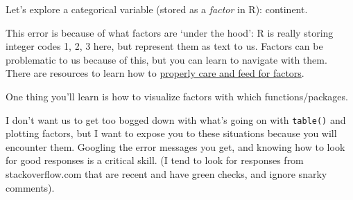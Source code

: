 \documentclass[]{book}
\newenvironment{Shaded}{\begin{snugshade}}{\end{snugshade}}
\newcommand{\KeywordTok}[1]{\textcolor[rgb]{0.13,0.29,0.53}{\textbf{{#1}}}}
\newcommand{\CommentTok}[1]{\textcolor[rgb]{0.56,0.35,0.01}{\textit{{#1}}}}
\newcommand{\NormalTok}[1]{{#1}}
\theoremstyle{definition}
\theoremstyle{definition}
\theoremstyle{definition}
\theoremstyle{remark}
\begin{document}
\begin{Shaded}
\end{Shaded}

Let's explore a categorical variable (stored as a \emph{factor} in R):
continent.

\begin{Shaded}
\end{Shaded}

This error is because of what factors are `under the hood': R is really
storing integer codes 1, 2, 3 here, but represent them as text to us.
Factors can be problematic to us because of this, but you can learn to
navigate with them. There are resources to learn how to
\href{http://stat545.com/block014_factors.html}{properly care and feed
for factors}.

One thing you'll learn is how to visualize factors with which
functions/packages.

\begin{Shaded}
\end{Shaded}

I don't want us to get too bogged down with what's going on with
\texttt{table()} and plotting factors, but I want to expose you to these
situations because you will encounter them. Googling the error messages
you get, and knowing how to look for good responses is a critical skill.
(I tend to look for responses from stackoverflow.com that are recent and
have green checks, and ignore snarky comments).
\end{document}
